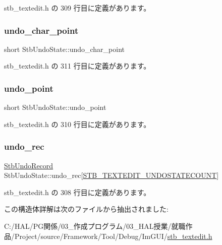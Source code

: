  stb\+\_\+textedit.\+h の 309 行目に定義があります。

\mbox{\label{struct_stb_undo_state_ad5c08b1f8c24678c44407f0ca805afcf}} 
\subsubsection{\texorpdfstring{undo\+\_\+char\+\_\+point}{undo\_char\_point}}
{\footnotesize\ttfamily short Stb\+Undo\+State\+::undo\+\_\+char\+\_\+point}



 stb\+\_\+textedit.\+h の 311 行目に定義があります。

\mbox{\label{struct_stb_undo_state_ad29a8695b3e8252ac164d0c2d0be7d7c}} 
\subsubsection{\texorpdfstring{undo\+\_\+point}{undo\_point}}
{\footnotesize\ttfamily short Stb\+Undo\+State\+::undo\+\_\+point}



 stb\+\_\+textedit.\+h の 310 行目に定義があります。

\mbox{\label{struct_stb_undo_state_a8cb07be8f304d1620b50bd024709023f}} 
\subsubsection{\texorpdfstring{undo\+\_\+rec}{undo\_rec}}
{\footnotesize\ttfamily \mbox{\hyperlink{struct_stb_undo_record}{Stb\+Undo\+Record}} Stb\+Undo\+State\+::undo\+\_\+rec\mbox{[}\mbox{\hyperlink{stb__textedit_8h_afa79483143df87a1497010712b3dfaf9}{S\+T\+B\+\_\+\+T\+E\+X\+T\+E\+D\+I\+T\+\_\+\+U\+N\+D\+O\+S\+T\+A\+T\+E\+C\+O\+U\+NT}}\mbox{]}}



 stb\+\_\+textedit.\+h の 308 行目に定義があります。



この構造体詳解は次のファイルから抽出されました\+:\begin{DoxyCompactItemize}
\item 
C\+:/\+H\+A\+L/\+P\+G関係/03\+\_\+作成プログラム/03\+\_\+\+H\+A\+L授業/就職作品/\+Project/source/\+Framework/\+Tool/\+Debug/\+Im\+G\+U\+I/\mbox{\hyperlink{stb__textedit_8h}{stb\+\_\+textedit.\+h}}\end{DoxyCompactItemize}
